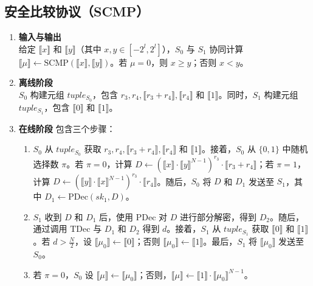 \subsection{安全比较协议（SCMP）}
\begin{enumerate}[leftmargin=*, nosep]
    \item \textbf{输入与输出}  \\
    给定 $\llbracket x \rrbracket$ 和 $\llbracket y \rrbracket$（其中 $x, y \in [-2^l, 2^l]$），$S_0$ 与 $S_1$ 协同计算 $\llbracket \mu \rrbracket \leftarrow \text{SCMP}(\llbracket x \rrbracket, \llbracket y \rrbracket)$。若 $\mu = 0$，则 $x \geq y$；否则 $x < y$。

    \item \textbf{离线阶段}  \\
    $S_0$ 构建元组 $tuple_{S_0}$，包含 $r_3, r_4, \llbracket r_3 + r_4 \rrbracket, \llbracket r_4 \rrbracket$ 和 $\llbracket 1 \rrbracket$。同时，$S_1$ 构建元组 $tuple_{S_1}$，包含 $\llbracket 0 \rrbracket$ 和 $\llbracket 1 \rrbracket$。

    \item \textbf{在线阶段}  
    包含三个步骤：
    \begin{enumerate}[leftmargin=*, nosep]
        \item $S_0$ 从 $tuple_{S_0}$ 获取 $r_3, r_4, \llbracket r_3 + r_4 \rrbracket, \llbracket r_4 \rrbracket$ 和 $\llbracket 1 \rrbracket$。接着，$S_0$ 从 $\{0, 1\}$ 中随机选择数 $\pi$。若 $\pi = 0$，计算 $D \leftarrow (\llbracket x \rrbracket \cdot \llbracket y \rrbracket^{N-1})^{r_3} \cdot \llbracket r_3 + r_4 \rrbracket$；若 $\pi = 1$，计算 $D \leftarrow (\llbracket y \rrbracket \cdot \llbracket x \rrbracket^{N-1})^{r_3} \cdot \llbracket r_4 \rrbracket$。随后，$S_0$ 将 $D$ 和 $D_1$ 发送至 $S_1$，其中 $D_1 \leftarrow \text{PDec}(sk_1, D)$。
        \item $S_1$ 收到 $D$ 和 $D_1$ 后，使用 $\text{PDec}$ 对 $D$ 进行部分解密，得到 $D_2$。随后，通过调用 $\text{TDec}$ 与 $D_1$ 和 $D_2$ 得到 $d$。接着，$S_1$ 从 $tuple_{S_1}$ 获取 $\llbracket 0 \rrbracket$ 和 $\llbracket 1 \rrbracket$。若 $d > \frac{N}{2}$，设 $\llbracket \mu_0 \rrbracket \leftarrow \llbracket 0 \rrbracket$；否则 $\llbracket \mu_0 \rrbracket \leftarrow \llbracket 1 \rrbracket$。最后，$S_1$ 将 $\llbracket \mu_0 \rrbracket$ 发送至 $S_0$。
        \item 若 $\pi = 0$，$S_0$ 设 $\llbracket \mu \rrbracket \leftarrow \llbracket \mu_0 \rrbracket$；否则，$\llbracket \mu \rrbracket \leftarrow \llbracket 1 \rrbracket \cdot \llbracket \mu_0 \rrbracket^{N-1}$。
    \end{enumerate}
\end{enumerate}

